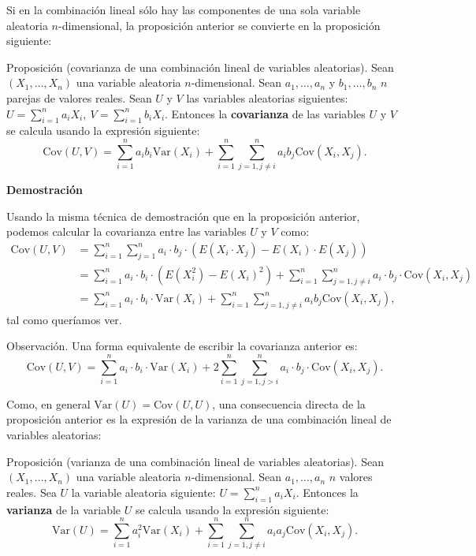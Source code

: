 \documentclass[]{book}
\begin{document}
Si en la combinación lineal sólo hay las componentes de una sola variable aleatoria \(n\)-dimensional, la proposición anterior se convierte en la proposición siguiente:

Proposición (covarianza de una combinación lineal de variables aleatorias).
Sean \((X_1,\ldots,X_n)\) una variable aleatoria \(n\)-dimensional. Sean \(a_1, \ldots, a_n\) y \(b_1,\ldots, b_n\) \(n\) parejas de valores reales. Sean \(U\) y \(V\) las variables aleatorias siguientes:
\(U=\sum\limits_{i=1}^n a_i X_i,\  V=\sum\limits_{i=1}^n b_i X_i.\)
Entonces la \textbf{covarianza} de las variables \(U\) y \(V\) se calcula usando la expresión siguiente:
\[
\mathrm{Cov}(U,V)=\sum_{i=1}^n a_i b_i \mathrm{Var}(X_i)+\sum_{i=1}^n\sum_{j=1,j\neq i}^n a_i b_j \mathrm{Cov}(X_i,X_j).
\]

\textbf{Demostración}

Usando la misma técnica de demostración que en la proposición anterior, podemos calcular la covarianza entre las variables \(U\) y \(V\) como:
\[
\begin{array}{rl}
\mathrm{Cov}(U,V) & = \sum\limits_{i=1}^n \sum\limits_{j=1}^n a_i\cdot  b_j\cdot  \left(E\left(X_i \cdot X_j\right) - E(X_i)\cdot  E(X_j)\right) \\
&= \sum\limits_{i=1}^n a_i\cdot  b_i \cdot \left(E\left(X_i^2\right) - E(X_i)^2\right)+\sum\limits_{i=1}^n \sum\limits_{j=1,j\neq i}^n a_i \cdot b_j\cdot  \mathrm{Cov}(X_i,X_j) \\ & = \sum\limits_{i=1}^n a_i\cdot  b_i\cdot  \mathrm{Var}(X_i)+\sum\limits_{i=1}^n \sum\limits_{j=1,j\neq i}^n a_i b_j \mathrm{Cov}(X_i,X_j),
\end{array}
\]
tal como queríamos ver.

 Observación.
Una forma equivalente de escribir la covarianza anterior es:
\[
\mathrm{Cov}(U,V)=\sum_{i=1}^n a_i\cdot  b_i\cdot  \mathrm{Var}(X_i)+2\sum_{i=1}^n\sum_{j=1,j>i}^n a_i\cdot  b_j\cdot  \mathrm{Cov}(X_i,X_j).
\]

Como, en general \(\mathrm{Var}(U)=\mathrm{Cov}(U,U)\), una consecuencia directa de la proposición anterior es la expresión de la varianza de una combinación lineal de variables aleatorias:

Proposición (varianza de una combinación lineal de variables aleatorias).
Sean \((X_1,\ldots,X_n)\) una variable aleatoria \(n\)-dimensional. Sean \(a_1, \ldots, a_n\) \(n\) valores reales. Sea \(U\) la variable aleatoria siguiente:
\(U=\sum\limits_{i=1}^n a_i X_i.\)
Entonces la \textbf{varianza} de la variable \(U\) se calcula usando la expresión siguiente:
\[
\mathrm{Var}(U)=\sum_{i=1}^n a_i^2 \mathrm{Var}(X_i)+\sum_{i=1}^n\sum_{j=1,j\neq i}^n a_i a_j \mathrm{Cov}(X_i,X_j).
\]
\end{document}

